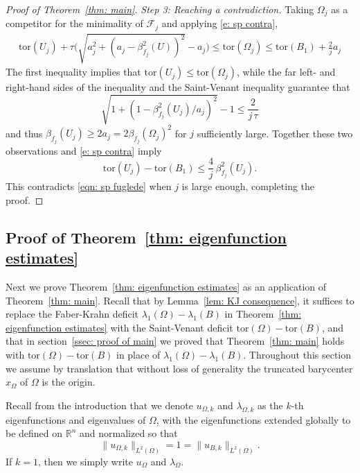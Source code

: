 \documentclass[10pt,a4paper]{amsart}
\numberwithin{equation}{section}
\def\R{{\mathbb R}}
\def\W{\Omega}
\def\tor{\mathrm{tor}}
\begin{document}
\begin{proof}[Proof of Theorem~\ref{thm: main}]
 {\it Step 3: Reaching a contradiction.}   
Taking $\W_j$ as a competitor for the minimality of $\mathcal{F}_j$ and applying \eqref{e: sp contra}, 
\begin{align*}
	\tor(U_j)  + \tau  \Big( \sqrt{a_j^2 + (a_j -\beta^2_{f_j}(U))^2} -a_j\Big)  \leq \tor(\W_j) \leq  \tor(B_1) + \frac{2}{j} a_j
\end{align*} 
The first inequality implies that $\tor(U_j) \leq \tor(\W_j)$, while the far left- and right-hand sides of the inequality and the Saint-Venant inequality guarantee that 
\[
\sqrt{1 + (1 -\beta^2_{f_j}(U_j)/a_j)^2} -1  \leq \frac{2}{j \,\tau } 
\]  
and thus $\beta_{f_j}(U_j)\geq 2 a_j= 2\beta_{f_j}(\W_j)^2$ for $j$ sufficiently large. Together these two observations and \eqref{e: sp contra} imply
	\begin{equation}
		\tor(U_j ) - \tor(B_1) \leq \frac{4}{j}\, \beta_{f_j}^2(U_j). 
	\end{equation}
	This contradicts \eqref{eqn: sp fuglede} when $j$ is large enough, completing the proof.
\end{proof}
%
%
%

\subsection{Proof of Theorem~\ref{thm: eigenfunction estimates}} Next we prove Theorem~\ref{thm: eigenfunction estimates} as an application of Theorem~\ref{thm: main}. Recall that by Lemma~\ref{lem: KJ consequence}, it suffices to replace the Faber-Krahn deficit $\lambda_1(\W)-\lambda_1(B)$ in Theorem~\ref{thm: eigenfunction estimates} with the Saint-Venant deficit $\tor(\W) -\tor(B)$, and that in section~\ref{ssec: proof of main} we proved that Theorem~\ref{thm: main} holds with $\tor(\W) -\tor(B)$ in place of $\lambda_1(\W)-\lambda_1(B)$.
Throughout this section we assume by translation that without loss of generality the truncated barycenter $x_\W$ of $\W$ is the origin.

Recall from the introduction that we denote $u_{\W,k}$ and $\lambda_{\W,k}$ as the $k$-th eigenfunctions and eigenvalues of $\Omega$, with the eigenfunctions extended globally to be defined on $\R^n$ and  normalized so that 
\begin{equation} \label{e:one}
 \| u_{\W,k} \|_{L^2(\W)} = 1 =  \| u_{B,k} \|_{L^2(\W)}. 
\end{equation}
If $k=1$, then we simply write $u_{\W}$ and $\lambda_{\W}$. 
\end{document}
